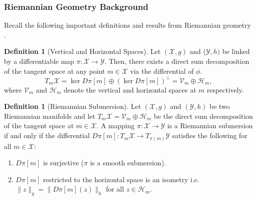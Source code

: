 \documentclass{amsart}
\theoremstyle{definition}
\newtheorem{definition}[theorem]{Definition}
\theoremstyle{remark}
\numberwithin{equation}{section}
\begin{document}
\subsubsection{Riemannian Geometry Background}\label{sec:riemannian_geometry_background}
Recall the following important definitions and results from Riemannian geometry \cite{bhatia2019bures}.
\begin{definition}[Vertical and Horizontal Spaces]
 Let $(\mathcal{X}, g)$ and ($\mathcal{Y}, h)$ be linked by a differentiable map $\pi: \mathcal{X} \to \mathcal{Y}$. Then, there exists a direct sum decomposition of the tangent space at any point $m \in \mathcal{X}$ via the differential of $\phi$.
\begin{equation}
    T_m \mathcal{X} = \ker D\pi[m] \oplus (\ker D\pi[m])^\perp = \mathcal{V}_m \oplus \mathcal{H}_m,
\end{equation}
where $\mathcal{V}_m$ and $\mathcal{H}_m$ denote the vertical and horizontal spaces at $m$ respectively.
\end{definition}
\begin{definition}[Riemannian Submersion]
Let $(\mathcal{X}, g)$ and $(\mathcal{Y},h)$ be two Riemannian manifolds and let $T_m\mathcal{X} = \mathcal{V}_m \oplus \mathcal{H}_m$ be the direct sum decomposition of the tangent space at $m \in \mathcal{X}$. A mapping $\pi : \mathcal{X} \to \mathcal{Y}$ is a Riemannian submersion if and only if the differential $D\pi[m]: T_m\mathcal{X} \to T_{\pi(m)}\mathcal{Y}$ satisfies the following for all $m \in \mathcal{X}$:
\begin{enumerate}
    \item $D\pi[m]$ is surjective ($\pi$ is a smooth submersion).
    \item $D\pi[m]$ restricted to the horizontal space is an isometry i.e.\ $\|z\|_g = \|D\pi[m](z)\|_h$ for all $z \in \mathcal{H}_m$.
\end{enumerate}
\end{definition}
\end{document}
